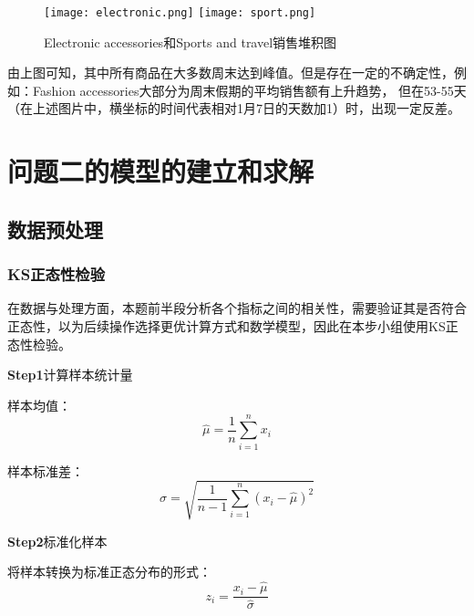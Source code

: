 \documentclass[withoutpreface,bwprint]{cumcmthesis}
\begin{document}
\begin{figure}[H]
\centering
{}
{\texttt{[image: electronic.png]}}
{\texttt{[image: sport.png]}}
\caption{Electronic accessories和Sports and travel销售堆积图}\label{fig:双图}
\end{figure} 

由上图可知，其中所有商品在大多数周末达到峰值。但是存在一定的不确定性，例如：Fashion accessories大部分为周末假期的平均销售额有上升趋势，
但在53-55天（在上述图片中，横坐标的时间代表相对1月7日的天数加1）时，出现一定反差。


\section{问题二的模型的建立和求解}
\subsection{数据预处理}

\subsubsection{KS正态性检验}\par
在数据与处理方面，本题前半段分析各个指标之间的相关性，需要验证其是否符合正态性，以为后续操作选择更优计算方式和数学模型，因此在本步小组使用KS正态性检验。

\textbf{Step1}计算样本统计量
\par
样本均值：
\begin{equation}
\label{eq:公式1}
 \hat{\mu} = \frac{1}{n} \sum_{i=1}^n x_i 
\end{equation}
\par


样本标准差：
\begin{equation}
\label{eq:公式1}
\hat{\sigma} = \sqrt{\frac{1}{n-1} \sum_{i=1}^n (x_i - \hat{\mu})^2} 
\end{equation}
\par

\textbf{Step2}标准化样本
\par
将样本转换为标准正态分布的形式：
\begin{equation}
\label{eq:公式1}
z_i = \frac{x_i - \hat{\mu}}{\hat{\sigma}}
\end{equation}
\end{document}

